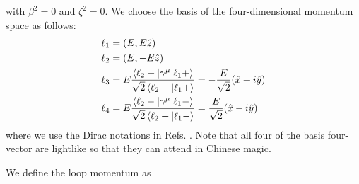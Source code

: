 with $\beta^2=0$ and $\zeta^2=0$. We choose the basis of the four-dimensional momentum space as follows:
\begin{align}
\ell_1&=(E,E\hat{z})\nonumber\\
\ell_2&=(E,-E\hat{z})\nonumber\\
\ell_3&=E\frac{\braket{\ell_2+|\gamma^\mu|\ell_1+}}{\sqrt{2}\braket{\ell_2-|\ell_1+}}=-\frac{E}{\sqrt{2}}(\hat{x}+i\hat{y})\nonumber\\
\ell_4&=E\frac{\braket{\ell_2-|\gamma^\mu|\ell_1-}}{\sqrt{2}\braket{\ell_2+|\ell_1-}}=\frac{E}{\sqrt{2}}(\hat{x}-i\hat{y})
\end{align}
where we use the Dirac notations in Refs. \cite{CALKUL,KS,MagicSpinor}. Note that all four of the basis four-vector are lightlike so that they can attend in Chinese magic. 

We define the loop momentum as

